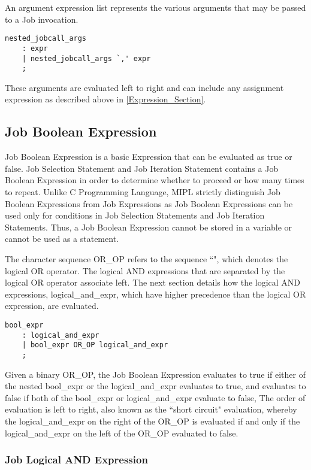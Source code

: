 \documentclass[prodmode,acmtecs]{acmsmall}
\begin{document}
An argument expression list represents the various arguments that may be
passed to a Job invocation. 

\begin{lstlisting}
nested_jobcall_args
	: expr
	| nested_jobcall_args `,' expr
	;
\end{lstlisting}

These arguments are evaluated left to right and can include any assignment 
expression as described above in \ref{Expression_Section}.
\medskip

\subsection{Job Boolean Expression}

Job Boolean Expression is a basic Expression that can be evaluated as
true or false.  Job Selection Statement and Job Iteration Statement
contains a Job Boolean Expression in order to determine whether to proceed
or how many times to repeat.  Unlike C Programming Language, MIPL strictly
distinguish Job Boolean Expressions from Job Expressions as Job Boolean
Expressions can be used only for conditions in Job Selection Statements
and Job Iteration Statements.  Thus, a Job Boolean Expression cannot be
stored in a variable or cannot be used as a statement.

The character sequence OR\_OP refers to the sequence ``\textbardbl", which  
denotes the logical OR operator. The logical AND expressions that are 
separated by the logical OR operator associate left. The next section 
details how the logical AND expressions, logical\_and\_expr, which have 
higher precedence than the logical OR expression, are evaluated. 

\begin{lstlisting}
bool_expr
	: logical_and_expr
	| bool_expr OR_OP logical_and_expr
	;
\end{lstlisting}

Given a binary OR\_OP, the Job Boolean Expression evaluates to true 
if either of the nested bool\_expr or the logical\_and\_expr evaluates
to true, and evaluates to false if both of the bool\_expr or
logical\_and\_expr evaluate to false, The order of evaluation is left
to right, also known as the ``short circuit" evaluation, whereby
the logical\_and\_expr on the right of the OR\_OP is evaluated if
and only if the logical\_and\_expr on the left of the OR\_OP 
evaluated to false. 
\medskip

\subsubsection{Job Logical AND Expression}
\end{document}
